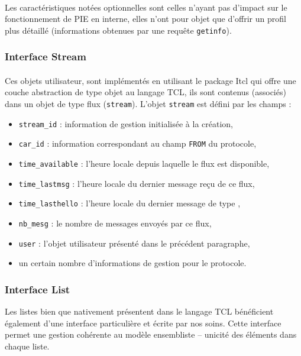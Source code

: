 \paragraph{}

Les caractéristiques notées optionnelles sont celles n'ayant pas d'impact
sur le fonctionnement de PIE en interne, elles n'ont pour objet que d'offrir
un profil plus détaillé (informations obtenues par une requête \texttt{getinfo}).
 
 
\subsubsection{Interface Stream}

\paragraph{}

Ces objets utilisateur, sont implémentés en utilisant le package Itcl qui offre
une couche abstraction de type objet au langage TCL, ils sont contenus
(associés) dans un objet de type flux (\texttt{stream}). L'objet \texttt{stream}
est défini par les champs :

\begin{itemize}
	\item \texttt{stream\_id} : information de gestion initialisée à la création,
	\item \texttt{car\_id} : information correspondant au champ \texttt{FROM} du protocole,
	\item \texttt{time\_available} : l'heure locale depuis laquelle le flux est disponible,
	\item \texttt{time\_lastmsg} : l'heure locale du dernier message reçu de ce flux,
	\item \texttt{time\_lasthello} : l'heure locale du dernier message de type \heartbeat,
	\item \texttt{nb\_mesg} : le nombre de messages envoyés par ce flux,
	\item \texttt{user} : l'objet utilisateur présenté dans le précédent paragraphe,
	\item un certain nombre d'informations de gestion pour le protocole.
\end{itemize}


\subsubsection{Interface List}

Les listes bien que nativement présentent dans le langage TCL bénéficient également
d'une interface particulière et écrite par nos soins. Cette interface permet une gestion
cohérente au modèle ensembliste -- unicité des éléments dans chaque liste.


